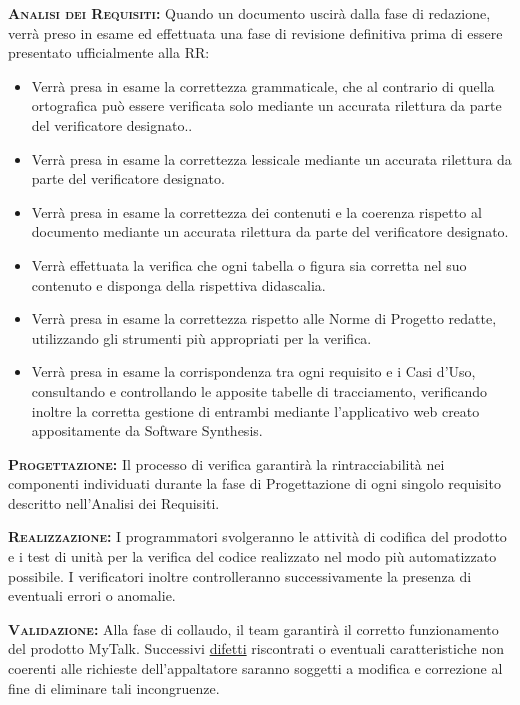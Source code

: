 \begin{description}
	\item{\scshape\bfseries Analisi dei Requisiti:} Quando un documento uscirà dalla fase di redazione, verrà preso in esame ed effettuata una fase di revisione definitiva prima di essere presentato ufficialmente alla RR: 
\begin{itemize}
		\item Verrà presa in esame la correttezza grammaticale, che al contrario di quella ortografica può essere verificata solo mediante un accurata rilettura da parte del verificatore designato..
		\item Verrà presa in esame la correttezza lessicale mediante un accurata rilettura da parte del verificatore designato.
		\item Verrà presa in esame la correttezza dei contenuti e la coerenza rispetto al documento mediante un accurata rilettura da parte del verificatore designato.
		\item Verrà effettuata la verifica che ogni tabella o figura sia corretta nel suo contenuto e disponga della rispettiva didascalia.
		\item Verrà presa in esame la correttezza rispetto alle Norme di Progetto redatte, utilizzando gli strumenti più appropriati per la verifica.
		\item Verrà presa in esame la corrispondenza tra ogni requisito e i Casi d'Uso, consultando e controllando le apposite tabelle di tracciamento, verificando inoltre la corretta gestione di entrambi mediante l'applicativo web creato appositamente da Software Synthesis.
\end{itemize}
	\item{\scshape\bfseries Progettazione:} Il processo di verifica garantirà la rintracciabilità nei componenti individuati durante la fase di Progettazione di ogni singolo requisito descritto nell'Analisi dei Requisiti.
	\item{\scshape\bfseries Realizzazione:} I programmatori svolgeranno le attività di codifica del prodotto e i test di unità per la verifica del codice realizzato nel modo più automatizzato possibile. I verificatori inoltre controlleranno successivamente la presenza di eventuali errori o anomalie.
	\item{\scshape\bfseries Validazione:} Alla fase di collaudo, il team garantirà il corretto funzionamento del prodotto MyTalk. Successivi \underline{difetti} riscontrati o eventuali caratteristiche non coerenti alle richieste dell'appaltatore saranno soggetti a modifica e correzione al fine di eliminare tali incongruenze. 
\end{description}
\clearpage
